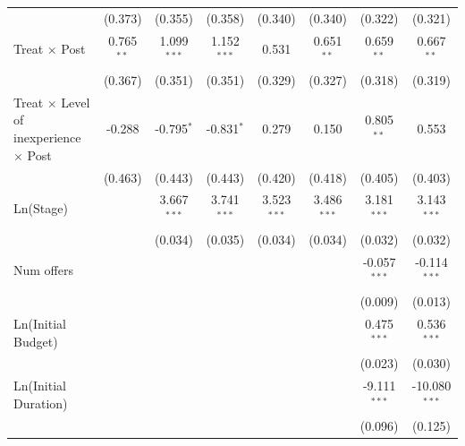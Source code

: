\documentclass[
]{article}
\begin{document}
\begin{tabular}{lccccccc}
                                                        & (0.373)        & (0.355)        & (0.358)        & (0.340)        & (0.340)        & (0.322)        & (0.321)\\   
   Treat $\times$ Post                                  & 0.765$^{**}$   & 1.099$^{***}$  & 1.152$^{***}$  & 0.531          & 0.651$^{**}$   & 0.659$^{**}$   & 0.667$^{**}$\\   
                                                        & (0.367)        & (0.351)        & (0.351)        & (0.329)        & (0.327)        & (0.318)        & (0.319)\\   
   Treat $\times$ Level of inexperience $\times$ Post   & -0.288         & -0.795$^{*}$   & -0.831$^{*}$   & 0.279          & 0.150          & 0.805$^{**}$   & 0.553\\   
                                                        & (0.463)        & (0.443)        & (0.443)        & (0.420)        & (0.418)        & (0.405)        & (0.403)\\   
   Ln(Stage)                                            &                & 3.667$^{***}$  & 3.741$^{***}$  & 3.523$^{***}$  & 3.486$^{***}$  & 3.181$^{***}$  & 3.143$^{***}$\\   
                                                        &                & (0.034)        & (0.035)        & (0.034)        & (0.034)        & (0.032)        & (0.032)\\   
   Num offers                                           &                &                &                &                &                & -0.057$^{***}$ & -0.114$^{***}$\\   
                                                        &                &                &                &                &                & (0.009)        & (0.013)\\   
   Ln(Initial Budget)                                   &                &                &                &                &                & 0.475$^{***}$  & 0.536$^{***}$\\   
                                                        &                &                &                &                &                & (0.023)        & (0.030)\\   
   Ln(Initial Duration)                                 &                &                &                &                &                & -9.111$^{***}$ & -10.080$^{***}$\\   
                                                        &                &                &                &                &                & (0.096)        & (0.125)\\   

\end{tabular}
\end{document}
